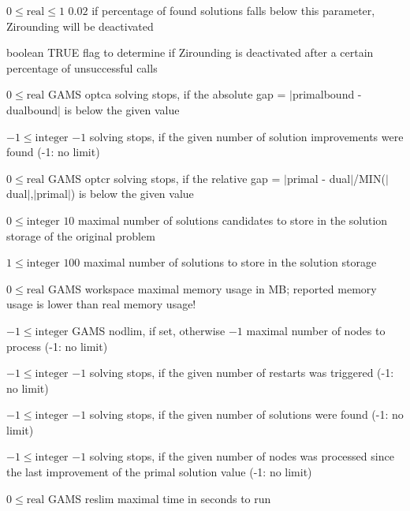 %
{$0\leq\textrm{real}\leq1$}%
{$0.02$}%
{if percentage of found solutions falls below this parameter, Zirounding will be deactivated}%
{}

%
{boolean}%
{TRUE}%
{flag to determine if Zirounding is deactivated after a certain percentage of unsuccessful calls}%
{}

%
{$0\leq\textrm{real}$}%
{GAMS optca}%
{solving stops, if the absolute gap = $|$primalbound - dualbound$|$ is below the given value}%
{}

%
{$-1\leq\textrm{integer}$}%
{$-1$}%
{solving stops, if the given number of solution improvements were found (-1: no limit)}%
{}

%
{$0\leq\textrm{real}$}%
{GAMS optcr}%
{solving stops, if the relative gap = $|$primal - dual$|$/MIN($|$dual$|$,$|$primal$|$) is below the given value}%
{}

%
{$0\leq\textrm{integer}$}%
{$10$}%
{maximal number of solutions candidates to store in the solution storage of the original problem}%
{}

%
{$1\leq\textrm{integer}$}%
{$100$}%
{maximal number of solutions to store in the solution storage}%
{}

%
{$0\leq\textrm{real}$}%
{GAMS workspace}%
{maximal memory usage in MB; reported memory usage is lower than real memory usage!}%
{}

%
{$-1\leq\textrm{integer}$}%
{GAMS nodlim, if set, otherwise $-1$}%
{maximal number of nodes to process (-1: no limit)}%
{}

%
{$-1\leq\textrm{integer}$}%
{$-1$}%
{solving stops, if the given number of restarts was triggered (-1: no limit)}%
{}

%
{$-1\leq\textrm{integer}$}%
{$-1$}%
{solving stops, if the given number of solutions were found (-1: no limit)}%
{}

%
{$-1\leq\textrm{integer}$}%
{$-1$}%
{solving stops, if the given number of nodes was processed since the last improvement of the primal solution value (-1: no limit)}%
{}

%
{$0\leq\textrm{real}$}%
{GAMS reslim}%
{maximal time in seconds to run}%
{}

